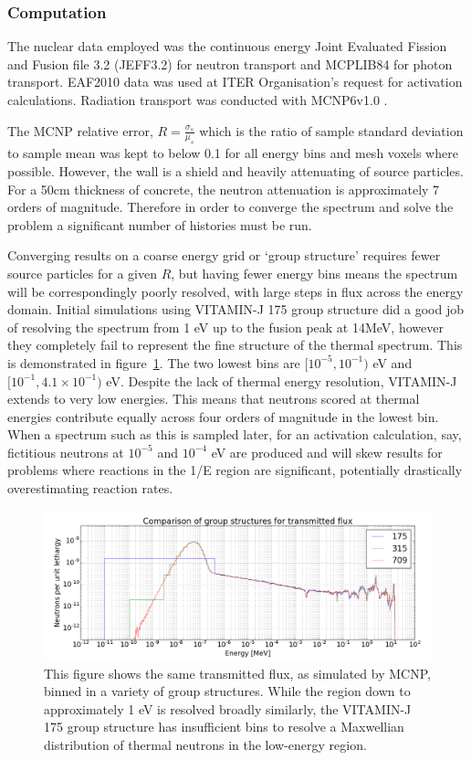 \subsubsection{Computation}
\label{subsubsec:rad_tran_comp}
The nuclear data employed was the continuous energy Joint Evaluated Fission and Fusion file 3.2 (JEFF3.2) for neutron transport and MCPLIB84 for photon transport. EAF2010 data was used at ITER Organisation's request for activation calculations. Radiation transport was conducted with MCNP6v1.0 \cite{Goorley2012}.

The MCNP relative error, $R = \frac{\sigma_{s}}{\mu_{s}}$ which is the ratio of sample standard deviation to sample mean was kept to below 0.1 for all energy bins and mesh voxels where possible. However, the wall is a shield and heavily attenuating of source particles. For a 50cm thickness of concrete, the neutron attenuation is approximately 7 orders of magnitude. Therefore in order to converge the spectrum and solve the problem a significant number of histories must be run. 

Converging results on a coarse energy grid or `group structure' requires fewer source particles for a given $R$, but having fewer energy bins means the spectrum will be correspondingly poorly resolved, with large steps in flux across the energy domain. Initial simulations using VITAMIN-J 175 group structure did a good job of resolving the spectrum from 1 eV up to the fusion peak at 14MeV, however they completely fail to represent the fine structure of the thermal spectrum. This is demonstrated in figure~\ref{fig:neutron_group_comparison}. The two lowest bins are $[10^{-5},10^{-1})$ eV and $[10^{-1},4.1\times10^{-1})$ eV. Despite the lack of thermal energy resolution, VITAMIN-J extends to very low energies. This means that neutrons scored at thermal energies contribute equally across four orders of magnitude in the lowest bin. When a spectrum such as this is sampled later, for an activation calculation, say, fictitious neutrons at $10^{-5}$ and $10^{-4}$ eV are produced and will skew results for problems where reactions in the 1/E region are significant, potentially drastically overestimating reaction rates. 

\begin{figure}[H]
  \includegraphics[width=\textwidth]{shield_flux_by_group.png}
  \caption{This figure shows the same transmitted flux, as simulated by MCNP, binned in a variety of group structures. While the region down to approximately 1 eV is resolved broadly similarly, the VITAMIN-J 175 group structure has insufficient bins to resolve a Maxwellian distribution of thermal neutrons in the low-energy region.}
  \label{fig:neutron_group_comparison}
\end{figure}

